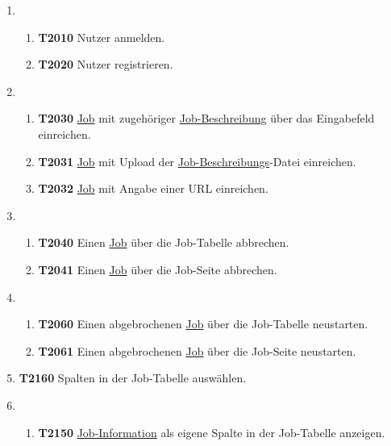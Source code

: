 \begin{enumerate}
    \item 
    \begin{enumerate}
        \item \textbf{T2010} \gls{Nutzer} anmelden.
        
        \item \textbf{T2020} \gls{Nutzer} registrieren.
    \end{enumerate}
    
    \item 
    \begin{enumerate}
        \item \textbf{T2030} \hyperref[B:Jobs]{Job} mit zugehöriger \hyperref[B:Job-Beschreibung]{Job-Beschreibung} über das Eingabefeld einreichen.
        
        \item \textbf{T2031} \hyperref[B:Jobs]{Job} mit Upload der \hyperref[B:Job-Beschreibung]{Job-Beschreibungs}-Datei einreichen.
        
        \item \textbf{T2032} \hyperref[B:Jobs]{Job} mit Angabe einer \gls{URL} einreichen.
    \end{enumerate}
    
    \item 
    \begin{enumerate}
        \item \textbf{T2040} Einen \hyperref[B:Jobs]{Job} über die Job-Tabelle abbrechen. 
        
        \item \textbf{T2041} Einen \hyperref[B:Jobs]{Job} über die Job-Seite abbrechen.
    \end{enumerate}
    
    \item
    \begin{enumerate}
        \item \textbf{T2060} Einen abgebrochenen \hyperref[B:Jobs]{Job} über die Job-Tabelle neustarten.
        
        \item \textbf{T2061} Einen abgebrochenen \hyperref[B:Jobs]{Job} über die Job-Seite neustarten. 
    \end{enumerate}
    

    \item \textbf{T2160} Spalten in der Job-Tabelle auswählen. 
    
    \item
    \begin{enumerate}
        \item \textbf{T2150} \hyperref[B:Job-Informationen]{Job-Information} als eigene Spalte in der Job-Tabelle anzeigen.
        

\end{enumerate}
\end{enumerate}
